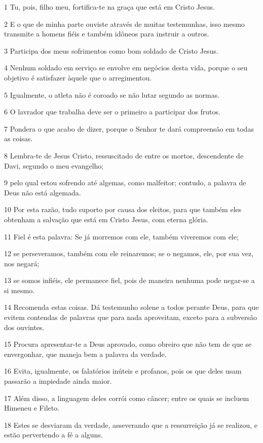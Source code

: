 \par 1 Tu, pois, filho meu, fortifica-te na graça que está em Cristo Jesus.
\par 2 E o que de minha parte ouviste através de muitas testemunhas, isso mesmo transmite a homens fiéis e também idôneos para instruir a outros.
\par 3 Participa dos meus sofrimentos como bom soldado de Cristo Jesus.
\par 4 Nenhum soldado em serviço se envolve em negócios desta vida, porque o seu objetivo é satisfazer àquele que o arregimentou.
\par 5 Igualmente, o atleta não é coroado se não lutar segundo as normas.
\par 6 O lavrador que trabalha deve ser o primeiro a participar dos frutos.
\par 7 Pondera o que acabo de dizer, porque o Senhor te dará compreensão em todas as coisas.
\par 8 Lembra-te de Jesus Cristo, ressuscitado de entre os mortos, descendente de Davi, segundo o meu evangelho;
\par 9 pelo qual estou sofrendo até algemas, como malfeitor; contudo, a palavra de Deus não está algemada.
\par 10 Por esta razão, tudo suporto por causa dos eleitos, para que também eles obtenham a salvação que está em Cristo Jesus, com eterna glória.
\par 11 Fiel é esta palavra: Se já morremos com ele, também viveremos com ele;
\par 12 se perseveramos, também com ele reinaremos; se o negamos, ele, por sua vez, nos negará;
\par 13 se somos infiéis, ele permanece fiel, pois de maneira nenhuma pode negar-se a si mesmo.
\par 14 Recomenda estas coisas. Dá testemunho solene a todos perante Deus, para que evitem contendas de palavras que para nada aproveitam, exceto para a subversão dos ouvintes.
\par 15 Procura apresentar-te a Deus aprovado, como obreiro que não tem de que se envergonhar, que maneja bem a palavra da verdade.
\par 16 Evita, igualmente, os falatórios inúteis e profanos, pois os que deles usam passarão a impiedade ainda maior.
\par 17 Além disso, a linguagem deles corrói como câncer; entre os quais se incluem Himeneu e Fileto.
\par 18 Estes se desviaram da verdade, asseverando que a ressurreição já se realizou, e estão pervertendo a fé a alguns.
